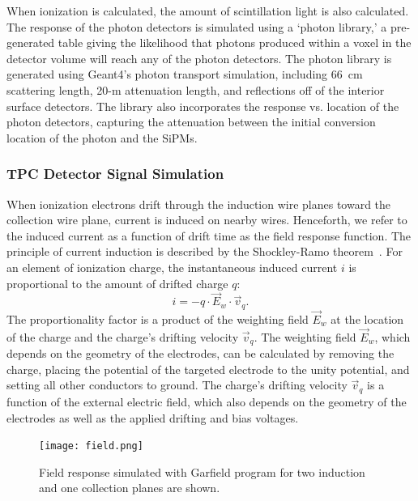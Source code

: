 When ionization is calculated, the amount of scintillation light is also calculated. The response of the photon detectors is simulated using a `photon library,' a pre-generated table giving the likelihood that photons produced within a voxel in the detector volume  will reach any of the photon detectors. The photon library is generated using Geant4's photon transport simulation, including 66~cm scattering length, 20-m attenuation length, and reflections off of the interior surface detectors. The library also incorporates the response vs. location of the photon detectors, capturing the attenuation between the initial conversion location of the photon and the SiPMs.

\subsubsection{TPC Detector Signal Simulation}

When ionization electrons drift through the induction wire planes toward the collection wire plane, current is induced on nearby wires. Henceforth, we refer to the induced current as a function of drift time as the field response function. 
The principle of current induction is described by the Shockley-Ramo theorem~\cite{Shockley1938,Ramo:1939vr}. For an element of ionization charge, the instantaneous induced current $i$ is proportional to the amount of drifted charge $q$: 
\begin{equation}\label{eq:shockley_ramo}
  i = - q \cdot \vec{E}_w \cdot \vec{v}_q.
\end{equation}
The proportionality factor is a product of the weighting field $\vec{E}_w$ at the location of the charge and the charge's drifting velocity $\vec{v}_q$. The weighting field $\vec{E}_w$, which depends on the geometry of the electrodes, can be calculated by removing the charge, placing the potential of the targeted electrode to the unity potential, and setting all other conductors to ground. The charge's drifting velocity $\vec{v}_q$ is a function of the external electric field, which also depends on the geometry of the electrodes as well as the applied drifting and bias voltages.

\begin{figure}[!htp]
\texttt{[image: field.png]}
\caption[field-resp]{Field response simulated with Garfield program 
for two induction and one collection planes are shown.}
\label{field_resp}
\end{figure}

